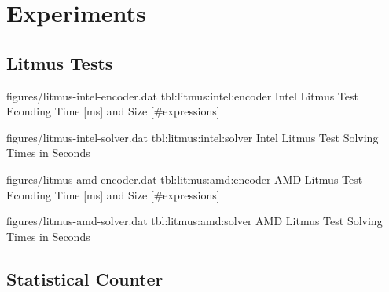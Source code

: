 
\section{Experiments}

\subsection{Litmus Tests}

\newcommand{\StatsTableRowHeader}[1]{\hyperref[tbl:#1]{\StrBehind[2]{#1}{:}}}


\EncoderStatsTable
  {figures/litmus-intel-encoder.dat}
  {tbl:litmus:intel:encoder}
  {Intel Litmus Test Econding Time [ms] and Size [\#expressions]}


\SolverStatsTable
  {figures/litmus-intel-solver.dat}
  {tbl:litmus:intel:solver}
  {Intel Litmus Test Solving Times in Seconds}

\newpage


\EncoderStatsTable
  {figures/litmus-amd-encoder.dat}
  {tbl:litmus:amd:encoder}
  {AMD Litmus Test Econding Time [ms] and Size [\#expressions]}


\SolverStatsTable
  {figures/litmus-amd-solver.dat}
  {tbl:litmus:amd:solver}
  {AMD Litmus Test Solving Times in Seconds}

\newpage

\subsection{Statistical Counter}

\renewcommand{\StatsTableRowHeader}[1]{\texttt{\StrBehind{#1}{count:buggy.}}}

\bigbreak\noindent
{}\bigbreak\noindent
{}\bigbreak

